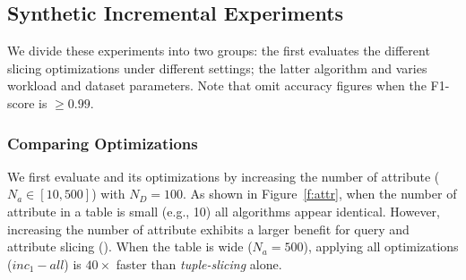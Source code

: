 \subsection{Synthetic Incremental Experiments}
\label{sec:experiments:synth}
We divide these experiments into two groups: the first evaluates the different slicing optimizations under different settings; 
the latter algorithm and varies workload and dataset parameters.
Note that omit accuracy figures when the F1-score is $\ge 0.99$.

\subsubsection{Comparing Optimizations}

We first evaluate \sys and its optimizations by increasing the number of attribute ($N_a \in [10, 500]$) with $N_D = 100$. 
As shown in Figure~\ref{f:attr}, when the number of attribute in a table is small (e.g., 10) all algorithms appear identical. 
However, increasing the number of attribute exhibits a larger benefit for query and attribute slicing ().
When the table is wide ($N_a = 500$), applying all optimizations ($inc_1-all$) is $40\times$ faster than \emph{tuple-slicing} alone.  

